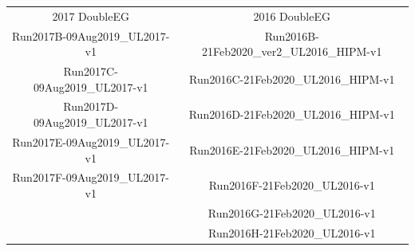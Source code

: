 \begin{center}
\begin{tabular}{ c c }
2017 DoubleEG & 2016 DoubleEG \\
Run2017B-09Aug2019\_UL2017-v1 & Run2016B-21Feb2020\_ver2\_UL2016\_HIPM-v1 \\
Run2017C-09Aug2019\_UL2017-v1 & Run2016C-21Feb2020\_UL2016\_HIPM-v1 \\
Run2017D-09Aug2019\_UL2017-v1 & Run2016D-21Feb2020\_UL2016\_HIPM-v1 \\
Run2017E-09Aug2019\_UL2017-v1 & Run2016E-21Feb2020\_UL2016\_HIPM-v1 \\
Run2017F-09Aug2019\_UL2017-v1 & Run2016F-21Feb2020\_UL2016-v1 \\
                              & Run2016G-21Feb2020\_UL2016-v1 \\
                              & Run2016H-21Feb2020\_UL2016-v1 \\
\end{tabular}
\end{center}





